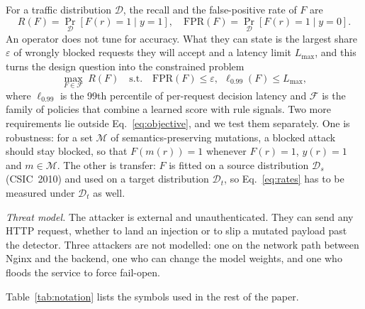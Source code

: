 \documentclass[preprint,11pt]{elsarticle}
\begin{document}
For a traffic distribution $\mathcal{D}$, the recall and the
false-positive rate of $F$ are
\begin{equation}
R(F)=\Pr_{\mathcal{D}}[F(r)=1\mid y=1],\quad
\mathrm{FPR}(F)=\Pr_{\mathcal{D}}[F(r)=1\mid y=0].
\label{eq:rates}
\end{equation}
An operator does not tune for accuracy. What they can state is the largest
share $\varepsilon$ of wrongly blocked requests they will accept and a
latency limit $L_{\max}$, and this turns the design question into the
constrained problem
\begin{equation}
\max_{F\in\mathcal{F}}\ R(F)\quad\text{s.t.}\quad
\mathrm{FPR}(F)\le\varepsilon,\ \ \ell_{0.99}(F)\le L_{\max},
\label{eq:objective}
\end{equation}
where $\ell_{0.99}$ is the 99th percentile of per-request decision latency
and $\mathcal{F}$ is the family of policies that combine a learned score
with rule signals. Two more requirements lie outside
Eq.~\eqref{eq:objective}, and we test them separately. One is robustness:
for a set $\mathcal{M}$ of semantics-preserving mutations, a blocked attack
should stay blocked, so that $F(m(r))=1$ whenever $F(r)=1$, $y(r)=1$ and
$m\in\mathcal{M}$. The other is transfer: $F$ is fitted on a source
distribution $\mathcal{D}_s$ (CSIC~2010) and used on a target distribution
$\mathcal{D}_t$, so Eq.~\eqref{eq:rates} has to be measured under
$\mathcal{D}_t$ as well.

\emph{Threat model.} The attacker is external and unauthenticated. They
can send any HTTP request, whether to land an injection or to slip a
mutated payload past the detector. Three attackers are not modelled: one on
the network path between Nginx and the backend, one who can change the
model weights, and one who floods the service to force fail-open.

Table~\ref{tab:notation} lists the symbols used in the rest of the paper.
\end{document}
